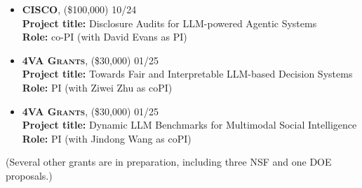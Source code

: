 \begin{itemize}

	\item \textbf{\textsc{CISCO}}, 
	(\$100,000) \hfill \textsc{10/24}\\
	{\bf Project title:} {Disclosure Audits for LLM-powered Agentic Systems}\\
	{\bf Role:} co-PI (with David Evans as PI)

	\item \textbf{\textsc{4VA Grants}}, 
	(\$30,000) \hfill \textsc{01/25}\\
	{\bf Project title:} {Towards Fair and Interpretable LLM-based Decision Systems}\\
	{\bf Role:} PI (with Ziwei Zhu as coPI)

	\item \textbf{\textsc{4VA Grants}}, 
	(\$30,000) \hfill \textsc{01/25}\\
	{\bf Project title:} {Dynamic LLM Benchmarks for Multimodal Social Intelligence}\\
	{\bf Role:} PI (with Jindong Wang as coPI)


\end{itemize}

(Several other grants are in preparation, including three NSF and one DOE proposals.)  


